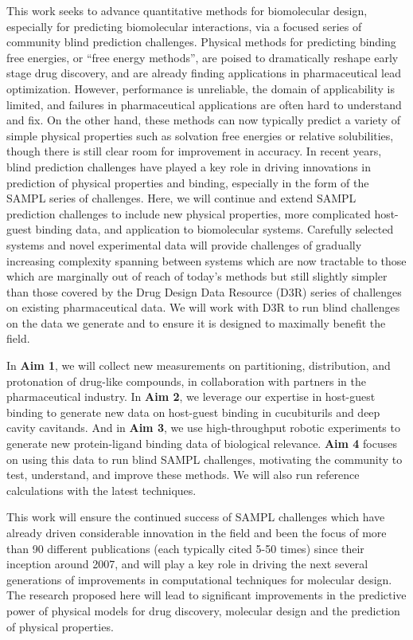 \documentclass[11pt]{article}
\begin{document}
This work seeks to advance quantitative methods for biomolecular design, especially for predicting biomolecular interactions, via a focused series of community blind prediction challenges. 
Physical methods for predicting binding free energies, or ``free energy methods'', are poised to dramatically reshape early stage drug discovery, and are already finding applications in pharmaceutical lead optimization. 
However, performance is unreliable, the domain of applicability is limited, and failures in pharmaceutical applications are often hard to understand and fix.
On the other hand, these methods can now typically predict a variety of simple physical properties such as solvation free energies or relative solubilities, though there is still clear room for improvement in accuracy.
In recent years, blind prediction challenges have played a key role in driving innovations in prediction of physical properties and binding, especially in the form of the SAMPL series of challenges. 
Here, we will continue and extend SAMPL prediction challenges to include new physical properties, more complicated host-guest binding data, and application to biomolecular systems.
Carefully selected systems and novel experimental data will provide challenges of gradually increasing complexity spanning between systems which are now tractable to those which are marginally out of reach of today's methods but still slightly simpler than those covered by the Drug Design Data Resource (D3R) series of challenges on existing pharmaceutical data. 
We will work with D3R to run blind challenges on the data we generate and to ensure it is designed to maximally benefit the field.

In {\bf Aim 1}, we will collect new measurements on partitioning, distribution, and protonation of drug-like compounds, in collaboration with partners in the pharmaceutical industry. In {\bf Aim 2}, we leverage our expertise in host-guest binding to generate new data on host-guest binding in cucubiturils and deep cavity cavitands. And in {\bf Aim 3}, we use high-throughput robotic experiments to generate new protein-ligand binding data of biological relevance. {\bf Aim 4} focuses on using this data to run blind SAMPL challenges, motivating the community to test, understand, and improve these methods. We will also run reference calculations with the latest techniques.

This work will ensure the continued success of SAMPL challenges which have already driven considerable innovation in the field and been the focus of more than 90 different publications (each typically cited 5-50 times) since their inception around 2007, and will play a key role in driving the next several generations of improvements in computational techniques for molecular design. 
The research proposed here will lead to significant improvements in the predictive power of physical models for drug discovery, molecular design and the prediction of physical properties.






%
%
%
%
\end{document}
